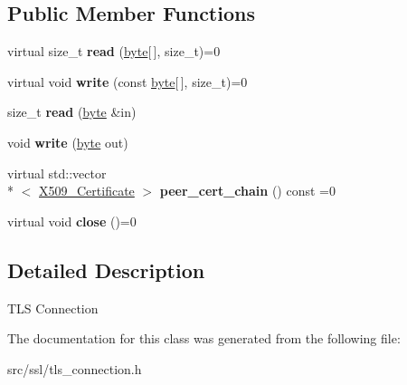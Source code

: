 \subsection*{Public Member Functions}
\begin{DoxyCompactItemize}
\item 
\hypertarget{classBotan_1_1TLS__Connection_a29e442ad5281122783aa68a5bd8b7ecd}{virtual size\-\_\-t {\bfseries read} (\hyperlink{namespaceBotan_a7d793989d801281df48c6b19616b8b84}{byte}\mbox{[}$\,$\mbox{]}, size\-\_\-t)=0}\label{classBotan_1_1TLS__Connection_a29e442ad5281122783aa68a5bd8b7ecd}

\item 
\hypertarget{classBotan_1_1TLS__Connection_a579ca495988720db1e7d1ae56208c573}{virtual void {\bfseries write} (const \hyperlink{namespaceBotan_a7d793989d801281df48c6b19616b8b84}{byte}\mbox{[}$\,$\mbox{]}, size\-\_\-t)=0}\label{classBotan_1_1TLS__Connection_a579ca495988720db1e7d1ae56208c573}

\item 
\hypertarget{classBotan_1_1TLS__Connection_ac340cece7dd813d7281ed5d0673fdbcf}{size\-\_\-t {\bfseries read} (\hyperlink{namespaceBotan_a7d793989d801281df48c6b19616b8b84}{byte} \&in)}\label{classBotan_1_1TLS__Connection_ac340cece7dd813d7281ed5d0673fdbcf}

\item 
\hypertarget{classBotan_1_1TLS__Connection_a1baec70d0436f8d3ed306c5b06e1111b}{void {\bfseries write} (\hyperlink{namespaceBotan_a7d793989d801281df48c6b19616b8b84}{byte} out)}\label{classBotan_1_1TLS__Connection_a1baec70d0436f8d3ed306c5b06e1111b}

\item 
\hypertarget{classBotan_1_1TLS__Connection_afe06cdc74e96b86c888d581330ddca61}{virtual std\-::vector\\*
$<$ \hyperlink{classBotan_1_1X509__Certificate}{X509\-\_\-\-Certificate} $>$ {\bfseries peer\-\_\-cert\-\_\-chain} () const =0}\label{classBotan_1_1TLS__Connection_afe06cdc74e96b86c888d581330ddca61}

\item 
\hypertarget{classBotan_1_1TLS__Connection_a4d923ece3c631246529ebcfcc1f3aa1c}{virtual void {\bfseries close} ()=0}\label{classBotan_1_1TLS__Connection_a4d923ece3c631246529ebcfcc1f3aa1c}

\end{DoxyCompactItemize}


\subsection{Detailed Description}
T\-L\-S Connection 

The documentation for this class was generated from the following file\-:\begin{DoxyCompactItemize}
\item 
src/ssl/tls\-\_\-connection.\-h\end{DoxyCompactItemize}
